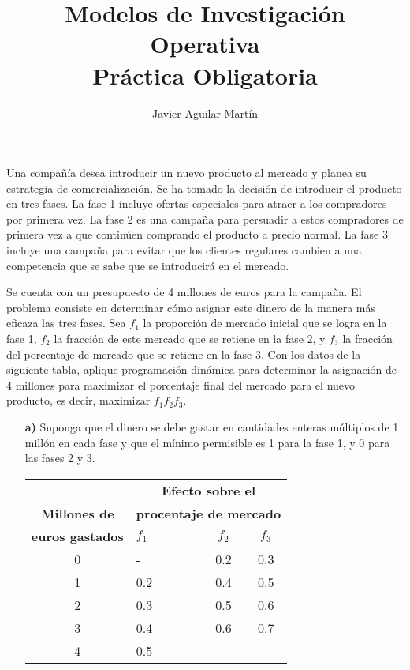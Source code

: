 \documentclass[twoside]{article}
\begin{document}
\title{Modelos de Investigación Operativa\\ Práctica Obligatoria}
\author{Javier Aguilar Martín}
\maketitle



\begin{ejercicio}{1}
Una compañía desea introducir un nuevo producto al mercado y planea su estrategia de comercialización. Se ha tomado la decisión de introducir el producto en tres fases. La fase 1 incluye ofertas especiales para atraer a los compradores por primera vez. La fase 2 es una campaña para persuadir a estos compradores de primera vez a que continúen comprando el producto a precio normal. La fase 3 incluye una campaña para evitar que los clientes regulares cambien a una competencia que se sabe que se introducirá en el mercado.

Se cuenta con un presupuesto de 4 millones de euros para la campaña. El problema consiste en determinar cómo asignar este dinero de la manera más eficaza las tres fases. Sea $f_1$ la proporción de mercado inicial que se logra en la fase 1, $f_2$ la fracción de este mercado que se retiene en la fase 2, y $f_3$ la fracción del porcentaje de mercado que se retiene en la fase 3. Con los datos de la siguiente tabla, aplique programación dinámica para determinar la asignación de 4 millones para maximizar el porcentaje final del mercado para el nuevo producto, es decir, maximizar $f_1f_2f_3$. 
\begin{itemize}
\item[\textbf{a)}] Suponga que el dinero se debe gastar en cantidades enteras múltiplos de 1 millón en cada fase y que el mínimo permisible es 1 para la fase 1, y 0 para las fases 2 y 3.
\begin{center}
\begin{tabular}{c|lcc}
 & \multicolumn{3}{c}{\textbf{Efecto sobre el}}\\
\textbf{Millones de } & \multicolumn{3}{c}{\textbf{procentaje de mercado}} \\\cline{2-4}
\textbf{euros gastados} & $f_1\qquad$ & $f_2$ & $f_3$\\
\hline
0 & - & 0.2   & 0.3\\
1 & 0.2 & 0.4 & 0.5\\
2 & 0.3 & 0.5 & 0.6\\
3 & 0.4 & 0.6 & 0.7\\
4 & 0.5 & - & -
\end{tabular}
\end{center}


\end{itemize}
\end{ejercicio}
\end{document}
